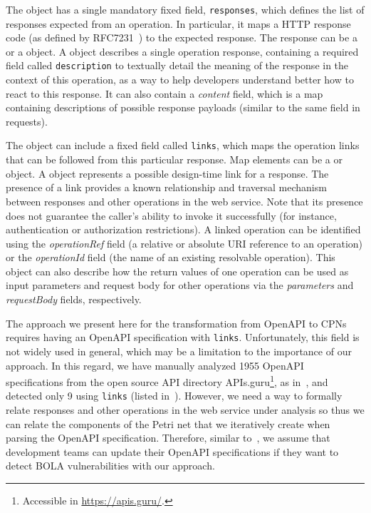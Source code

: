 The  object has a single mandatory fixed field, {\tt responses}, which defines the list of  responses expected from an operation. In particular, it maps a HTTP response code (as defined by RFC7231~\cite{fielding2014hypertext}) to the expected response. The response can be a  or a  object. A  object describes a single operation response, containing a required field called \texttt{description} to textually detail the meaning of the response in the context of this operation, as a way to help developers understand better how to react to this response. It can also contain a \textit{content} field, which is a map containing descriptions of possible response payloads (similar to the same field in requests).

The  object can include a fixed field called {\tt links}, which maps the operation links that can be followed from this particular response. Map elements can be a  or  object. A  object represents a possible design-time link for a response. The presence of a link provides a known relationship and traversal mechanism between responses and other operations in the web service. Note that its presence does not guarantee the caller's ability to invoke it successfully (for instance,  authentication or authorization restrictions). A linked operation can be identified using the \textit{operationRef} field (a relative or absolute URI reference to an operation) or the \textit{operationId} field (the name of an existing resolvable operation). This object can also describe how the return values of one operation can be used as input parameters and request body for other operations via the \textit{parameters} and \textit{requestBody} fields, respectively.

The approach we present here for the transformation from OpenAPI to CPNs requires having an OpenAPI specification with {\tt links}. Unfortunately, this field is not widely used in general, which may be a limitation to the importance of our approach. In this regard, we have manually analyzed 1955 OpenAPI specifications from the open source API directory APIs.guru\footnote{Accessible in \url{https://apis.guru/}.}, as in~\cite{Kus2020}, and detected only 9 using {\tt links} (listed in~\cite{links2cpn}). However, we need a way to formally relate responses and other operations in the web service under analysis so thus we can relate the components of the Petri net that we iteratively create when parsing the OpenAPI specification. Therefore, similar to~\cite{DBLP:journals/corr/abs-2201-10833,haddad2022openapi}, we assume that development teams can update their OpenAPI specifications if they want to detect BOLA vulnerabilities with our approach.


